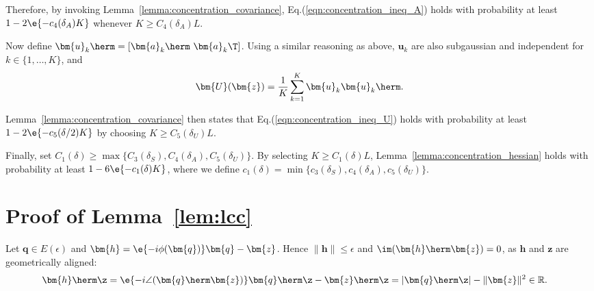 Therefore, by invoking Lemma~\ref{lemma:concentration_covariance},   Eq.(\ref{eqn:concentration_ineq_A}) holds with probability at least $1-2\e{-c_4(\delta_A)K}$ whenever $K\geq C_4(\delta_A)L$.

Now define $\bm{u}_k\herm=[\bm{a}_k\herm\,\,\bm{a}_k\T ]$. Using a similar reasoning as above, $\bm{u}_k$ are also subgaussian and independent for $k\in\{1,\ldots,K\}$, and 
\begin{align}
	\bm{U}(\bm{z})= \frac{1}{K}\sum_{k=1}^K\bm{u}_k\bm{u}_k\herm. \nonumber
\end{align}

Lemma~\ref{lemma:concentration_covariance} then states that Eq.(\ref{eqn:concentration_ineq_U}) holds with probability at least $1-2\e{-c_5(\delta/2)K}$ by choosing $K\geq C_5(\delta_U)L$.

Finally, set $C_1(\delta)\geq\max\{C_3(\delta_S),C_4(\delta_A),C_5(\delta_U)\}$. By selecting $K\geq C_1(\delta)L$, Lemma~\ref{lemma:concentration_hessian} holds with probability at least $1-6\e{-c_1(\delta)K}$, where we define  $c_1(\delta)=\min\{c_3(\delta_S),c_4(\delta_A),c_5(\delta_U)\}$.



\section{Proof of Lemma~\ref{lem:lcc}}\label{appdx:llc}
Let $\bm{q}\in E(\epsilon)$ and $\bm{h}=\e{-i\phi(\bm{q})}\bm{q}-\bm{z}$. Hence $\|\bm{h}\|\leq\epsilon$ and $\im(\bm{h}\herm\bm{z})=0$, as $\bm{h}$ and $\bm{z}$ are geometrically aligned:
\begin{align}
	\bm{h}\herm\z&=\e{-i\angle(\bm{q}\herm\bm{z})}\bm{q}\herm\z-\bm{z}\herm\z %
	=|\bm{q}\herm\z|-\|\bm{z}\|^2\in\mathbb{R}.
\end{align}

